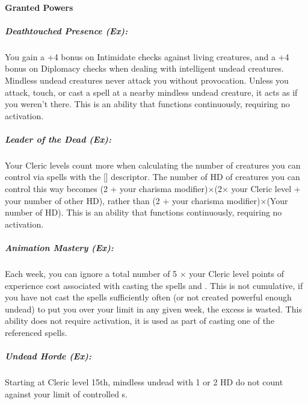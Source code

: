 \paragraph{Granted Powers}
\subparagraph{Deathtouched Presence (Ex):}
You gain a +4 bonus on Intimidate checks against living creatures, and a +4 bonus on Diplomacy checks when dealing with intelligent undead creatures.
Mindless undead creatures never attack you without provocation. Unless you attack, touch, or cast a spell at a nearby mindless undead creature, it acts as if you weren't there.
This is an ability that functions continuously, requiring no activation.
\subparagraph{Leader of the Dead (Ex):}
Your Cleric levels count more when calculating the number of creatures you can control via spells with the [] descriptor.
The number of HD of creatures you can control this way becomes (2 + your charisma modifier)$\times$(2$\times$ your Cleric level + your number of other HD), rather than (2 + your charisma modifier)$\times$(Your number of HD).
This is an ability that functions continuously, requiring no activation.
\subparagraph{Animation Mastery (Ex):}
Each week, you can ignore a total number of 5 $\times$ your Cleric level points of experience cost associated with casting the spells  and . This is not cumulative, if you have not cast the spells sufficiently often (or not created powerful enough undead) to put you over your limit in any given week, the excess is wasted.
This ability does not require activation, it is used as part of casting one of the referenced spells.
\subparagraph{Undead Horde (Ex):}
Starting at Cleric level 15th, mindless undead with 1 or 2 HD do not count against your limit of controlled s.
